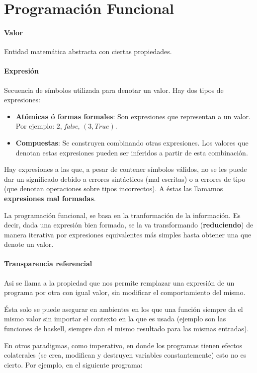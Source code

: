 
\section{Programación Funcional}

\paragraph{Valor} Entidad matemática abstracta con ciertas propiedades.

\paragraph{Expresión} 
Secuencia de símbolos utilizada para denotar un valor. Hay dos tipos de expresiones:
\begin{itemize}
	\item \textbf{Atómicas ó formas formales}: Son expresiones que representan a un valor. Por ejemplo: $2$, \textit{false}, $(3, True)$.
	\item \textbf{Compuestas}: Se construyen combinando otras expresiones. Los valores que denotan estas expresiones pueden ser inferidos a partir de esta combinación.
\end{itemize}

Hay expresiones a las que, a pesar de contener símbolos válidos, no se les puede dar un significado debido a errores sintácticos (mal escritas) o a errores de tipo (que denotan operaciones sobre tipos incorrectos). A éstas las llamamos \textbf{expresiones mal formadas}.

La programación funcional, se basa en la tranformación de la información. Es decir, dada una expresión bien formada, se la va transformando (\textbf{reduciendo}) de manera iterativa por expresiones equivalentes más simples hasta obtener una que denote un valor.

\paragraph{Transparencia referencial} Asi se llama a la propiedad que nos permite remplazar una expresión de un programa por otra con igual valor, sin modificar el comportamiento del mismo.

Ésta solo se puede asegurar en ambientes en los que una función siempre da el mismo valor sin importar el contexto en la que es usada (ejemplo son las funciones de haskell, siempre dan el mismo resultado para las mismas entradas). 

En otros paradigmas, como imperativo, en donde los programas tienen efectos colaterales (se crea, modifican y destruyen variables constantemente) esto no es cierto. Por ejemplo, en el siguiente programa:

